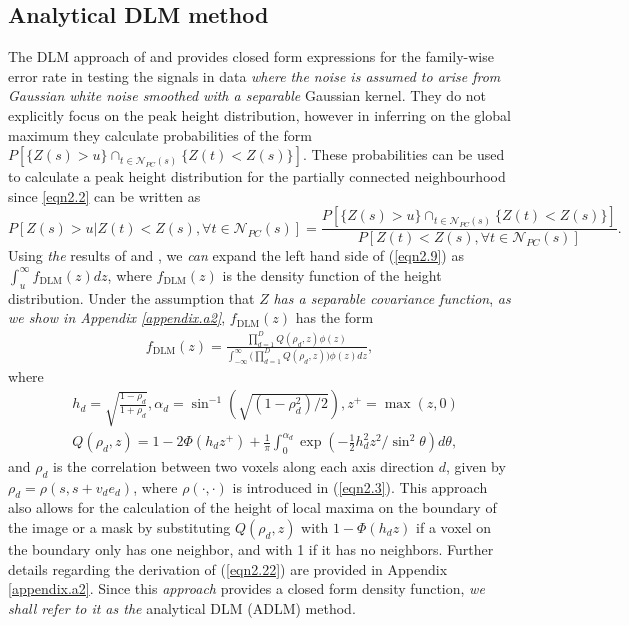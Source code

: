 \documentclass{article}
\newcommand{\nt}[1]{\textit{\color{red} #1}}
\begin{document}
\subsection{Analytical DLM method} 
\label{sec2.1}
The DLM approach of \cite{worsley2005improved} and \cite{taylor2007maxima} provides closed form expressions for the family-wise error rate in testing the signals in data \nt{where the noise is assumed to arise from Gaussian white noise smoothed with a separable} Gaussian kernel. They do not explicitly focus on the peak height distribution, however in inferring on the global maximum they calculate probabilities of the form $ P\left[\{Z(s) > u\}\cap_{t\in\mathcal{N}_{PC}(s)}\{Z(t) < Z(s)\}\right] $. These probabilities can be used to calculate a peak height distribution for the partially connected neighbourhood since \eqref{eqn2.2} can be written as
\begin{equation}
P [Z(s) > u|Z(t) < Z(s), \forall t \in \mathcal{N}_{PC}(s)] = \frac{P\left[\{Z(s) > u\}\cap_{t\in\mathcal{N}_{PC}(s)}\{Z(t) < Z(s)\}\right]}{P[Z(t) < Z(s), \forall t \in \mathcal{N}_{PC}(s)]}. \label{eqn2.9}
\end{equation}
Using \nt{the} results of \cite{worsley2005improved} and \cite{taylor2007maxima}, we \nt{can} expand the left hand side of (\ref{eqn2.9}) as $\int_u^{\infty} f_{\text{DLM}}(z) dz$, where $f_{\text{DLM}}(z)$ is the density function of the height distribution. Under the assumption that $Z$ \nt{has a separable covariance function}, \nt{as we show in Appendix \ref{appendix.a2}}, $f_{\text{DLM}}(z)$ has the form
\begin{align}
f_{\text{DLM}}(z) = \frac{\prod_{d=1}^DQ(\rho_d,z)\phi(z)}{\int_{-\infty}^\infty\bigg(\prod_{d=1}^DQ(\rho_d,z)\bigg)\phi(z)dz} \label{eqn2.22},
\end{align}
where
\begin{align}
&h_d = \sqrt{\frac{1-\rho_d}{1+\rho_d}}, \alpha_d = \sin^{-1}\left(\sqrt{(1-\rho_d^2)/2}\right), z^+ = \max(z,0) \nonumber\\
&Q(\rho_d, z) = 1 - 2\Phi(h_dz^+) + \frac{1}{\pi}\int_{0}^{\alpha_d}\exp\left(-\frac{1}{2}h^2_dz^2/\sin^2\theta\right)d\theta, \label{sdfsdf}
\end{align}
and $\rho_d$ is the correlation between two voxels along each axis direction $d$, given by $\rho_d = \rho(s, s+v_de_d)$, where $\rho(\cdot,\cdot)$ is introduced in (\ref{eqn2.3}).  This approach also allows for the calculation of the height of local maxima on the boundary of the image or a mask by substituting $Q(\rho_d, z)$ with $1-\Phi(h_dz)$ if a voxel on the boundary only has one neighbor, and with 1 if it has no neighbors. Further details regarding the derivation of (\ref{eqn2.22}) are provided in Appendix \ref{appendix.a2}. Since this \nt{approach} provides a closed form density function, \nt{we shall refer to it as the} analytical DLM (ADLM) method.  
\end{document}
